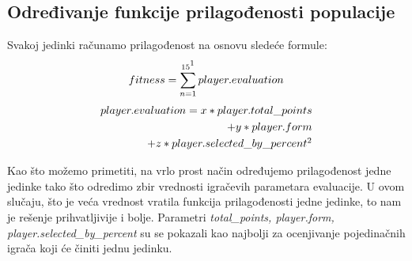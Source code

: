\documentclass[a4paper]{article}
\begin{document}
\subsection{Određivanje funkcije prilagođenosti populacije}
Svakoj jedinki računamo prilagođenost na osnovu sledeće formule: 
	\begin{gather*}
		 fitness = \sum_{n=1}^{15 \footnotemark } player.evaluation \\
	\end{gather*}
	\begin{gather*}
		\begin{aligned}
		player.evaluation = x*player.total\_points \\ + y*player.form \\ + z*player.selected\_by\_percent \footnotemark \\
		\end{aligned}
	\end{gather*}

Kao što možemo primetiti, na vrlo prost način određujemo prilagođenost jedne jedinke tako što odredimo zbir vrednosti igračevih parametara evaluacije. U ovom slučaju, što je veća vrednost vratila funkcija prilagođenosti jedne jedinke, to nam je rešenje prihvatljivije i bolje. Parametri \textit{total\_points, player.form, player.selected\_by\_percent} su se pokazali kao najbolji za ocenjivanje pojedinačnih igrača koji će činiti jednu jedinku.
\end{document}
